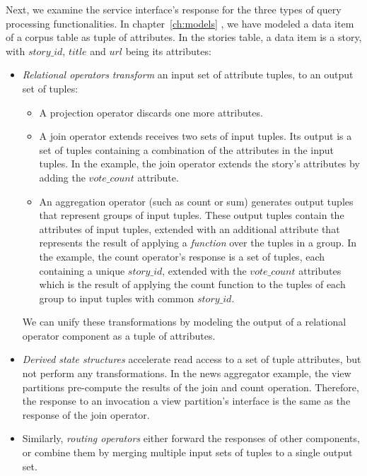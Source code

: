 Next, we examine the service interface's response for the three types of query processing functionalities.
In chapter~\ref{ch:models} , we have modeled a data item of a corpus table as tuple of attributes.
In the stories table, a data item is a story, with $story\_id$, $title$ and $url$ being its attributes:
\begin{itemize}
  \item \textit{Relational operators} \textit{transform} an input set of attribute tuples, to an output set of tuples:
    \begin{itemize}
    \item A projection operator discards one more attributes.
    \item A join operator extends receives two sets of input tuples.
    Its output is a set of tuples containing a combination of the attributes in the input tuples.
    In the example, the join operator extends the story's attributes by adding the $vote\_count$ attribute.
    \item An aggregation operator (such as count or sum) generates output tuples that represent groups of input tuples.
    These output tuples contain the attributes of input tuples, extended with an additional attribute that represents the
    result of applying a \textit{function} over the tuples in a group.
    In the example, the count operator's response is a set of tuples,
    each containing a unique $story\_id$, extended with the $vote\_count$ attributes
    which is the result of applying the count function to the tuples of each group to input tuples with common $story\_id$.
    \end{itemize}
  We can unify these transformations by modeling the output of a relational operator component as a tuple of attributes.

  \item \textit{Derived state structures} accelerate read access to a set of tuple attributes,
  but not perform any transformations.
  In the news aggregator example, the view partitions pre-compute the results of the join and count operation.
  Therefore, the response to an invocation a view partition's interface is the same as the response of the join operator.

  \item Similarly, \textit{routing operators} either forward the responses of other components, or combine them by merging
  multiple input sets of tuples to a single output set.

  \end{itemize}

